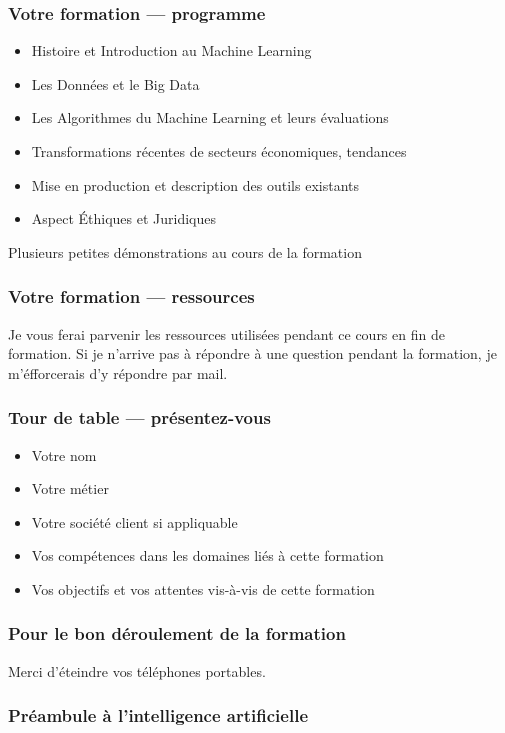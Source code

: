 \documentclass{formation}
\begin{document}
\begin{frame}
  \frametitle{Votre formation — programme}
  \begin{itemize}
  \item Histoire et Introduction au Machine Learning
  \item Les Données et le Big Data
  \item Les Algorithmes du Machine Learning et leurs évaluations
  \item Transformations récentes de secteurs économiques, tendances
  \item Mise en production et description des outils existants
  \item Aspect Éthiques et Juridiques
  \end{itemize}
  Plusieurs petites démonstrations au cours de la formation

\end{frame}

\begin{frame}
  \frametitle{Votre formation — ressources}
  Je vous ferai parvenir les ressources utilisées pendant ce cours en fin de formation.
  Si je n'arrive pas à répondre à une question pendant la formation, je m'éfforcerais d'y répondre par mail.
\end{frame}

\begin{frame}
  \frametitle{Tour de table — présentez-vous}

  \begin{itemize}
  \item Votre nom
  \item Votre métier
  \item Votre société client si appliquable
  \item Vos compétences dans les domaines liés à cette formation
  \item Vos objectifs et vos attentes vis-à-vis de cette formation
  \end{itemize}
\end{frame}

\begin{frame}
  \frametitle{Pour le bon déroulement de la formation}
  Merci d'éteindre vos téléphones portables.
\end{frame}

\begin{frame}
  \frametitle{Préambule à l'intelligence artificielle}
  \begin{center}
    \huge{}
  \end{center}
\end{frame}
\end{document}
